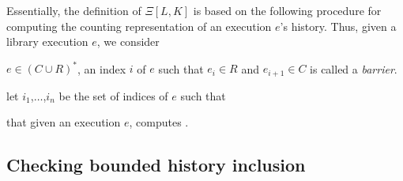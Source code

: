 Essentially, the definition of $\Xi[L,K]$ is based on the following procedure for computing the counting 
representation of an execution $e$'s history. Thus, given a library execution $e$, we consider 

$e\in (C\cup R)^*$, an index $i$ of $e$
such that $e_i\in R$ and $e_{i+1}\in C$ is called a \emph{barrier}. 


let $i_1$,$\ldots$,$i_n$ be the 
set of indices of $e$ such that 

that given an execution $e$, computes . 

\subsection{Checking bounded history inclusion}





